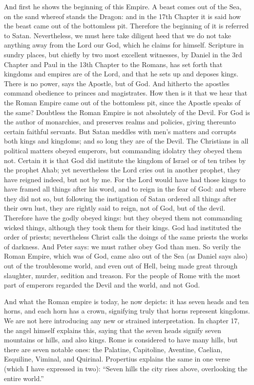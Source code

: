 And first he shows the beginning of this Empire. A beast comes out of the Sea, on the sand whereof stands the Dragon: and in the 17th Chapter it is said how the beast came out of the bottomless pit. Therefore the beginning of it is referred to Satan. Nevertheless, we must here take diligent heed that we do not take anything away from the Lord our God, which he claims for himself. Scripture in sundry places, but chiefly by two most excellent witnesses, by Daniel in the 3rd Chapter and Paul in the 13th Chapter to the Romans, has set forth that kingdoms and empires are of the Lord, and that he sets up and deposes kings. There is no power, says the Apostle, but of God. And hitherto the apostles command obedience to princes and magistrates. How then is it that we hear that the Roman Empire came out of the bottomless pit, since the Apostle speaks of the same? Doubtless the Roman Empire is not absolutely of the Devil. For God is the author of monarchies, and preserves realms and policies, giving thereunto certain faithful servants. But Satan meddles with men's matters and corrupts both kings and kingdoms; and so long they are of the Devil. The Christians in all political matters obeyed emperors, but commanding idolatry they obeyed them not. Certain it is that God did institute the kingdom of Israel or of ten tribes by the prophet Ahab; yet nevertheless the Lord cries out in another prophet, they have reigned indeed, but not by me. For the Lord would have had those kings to have framed all things after his word, and to reign in the fear of God: and where they did not so, but following the instigation of Satan ordered all things after their own lust, they are rightly said to reign, not of God, but of the devil. Therefore have the godly obeyed kings: but they obeyed them not commanding wicked things, although they took them for their kings. God had instituted the order of priests; nevertheless Christ calls the doings of the same priests the works of darkness. And Peter says: we must rather obey God than men. So verily the Roman Empire, which was of God, came also out of the Sea (as Daniel says also) out of the troublesome world, and even out of Hell, being made great through slaughter, murder, sedition and treason. For the people of Rome with the most part of emperors regarded the Devil and the world, and not God.

And what the Roman empire is today, he now depicts: it has seven heads and ten horns, and each horn has a crown, signifying truly that horns represent kingdoms. We are not here introducing any new or strained interpretation. In chapter 17, the angel himself explains this, saying that the seven heads signify seven mountains or hills, and also kings. Rome is considered to have many hills, but there are seven notable ones: the Palatine, Capitoline, Aventine, Caelian, Esquiline, Viminal, and Quirinal. Propertius explains the same in one verse (which I have expressed in two): “Seven hills the city rises above, overlooking the entire world.”

